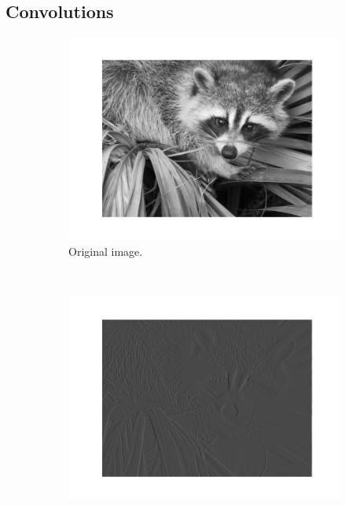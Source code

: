     \subsection{Convolutions}
    \label{sec:convolutions}

        \begin{figure}[!ht]
            \centering
            \begin{subfigure}[t]{0.5\textwidth}
                \centering
                \includegraphics[width=\textwidth]{images/face.png}
                \caption{Original image.}
                \label{fig:convolution-face-original}
            \end{subfigure}%
            ~
            \begin{subfigure}[t]{0.5\textwidth}
                \centering
                \includegraphics[width=\textwidth]{images/face_convolved.png}

\end{subfigure}
\end{figure}
